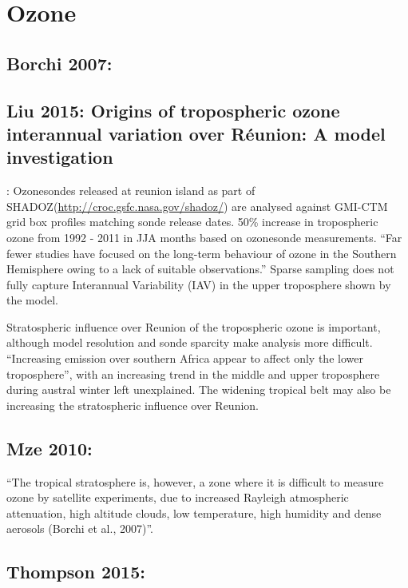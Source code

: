 \documentclass[11pt]{article} %
\begin{document}

\section{Ozone}
  \subsection{Borchi 2007:}


  \subsection{Liu 2015: Origins of tropospheric ozone interannual variation over Réunion: A model investigation}
    \citet{Liu2015}:
    Ozonesondes released at reunion island as part of SHADOZ(\url{http://croc.gsfc.nasa.gov/shadoz/}) are analysed against GMI-CTM grid box profiles matching sonde release dates.
    50\% increase in tropospheric ozone from 1992 - 2011 in JJA months based on ozonesonde measurements.
    ``Far fewer studies have focused on the long-term behaviour of ozone in the Southern Hemisphere owing to a lack of suitable observations.''
    Sparse sampling does not fully capture Interannual Variability (IAV) in the upper troposphere shown by the model.
    
    Stratospheric influence over Reunion of the tropospheric ozone is important, although model resolution and sonde sparcity make analysis more difficult.
    ``Increasing emission over southern Africa appear to affect only the lower troposphere'', with an increasing trend in the middle and upper troposphere during austral winter left unexplained.
    The widening tropical belt may also be increasing the stratospheric influence over Reunion.

  \subsection{Mze 2010:}
    \citet{Mze2010}
    ``The tropical stratosphere is, however, a zone where it is difficult to measure ozone by satellite experiments, due to increased Rayleigh atmospheric attenuation, high altitude clouds, low temperature, high humidity and dense aerosols (Borchi et al., 2007)''.

  \subsection{Thompson 2015: }
  
\printbibliography[heading=bibintoc]
\end{document}
